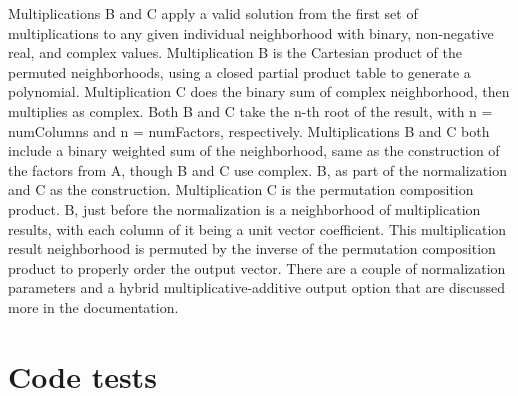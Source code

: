 \documentclass[11pt]{article}
\begin{document}
Multiplications B and C apply a valid solution from the first set of multiplications to any given individual neighborhood with binary, non-negative real, and complex values. Multiplication B is the Cartesian product of the permuted neighborhoods, using a closed partial product table to generate a polynomial. Multiplication C does the binary sum of complex neighborhood, then multiplies as complex. Both B and C take the n-th root of the result, with n = numColumns and n = numFactors, respectively. Multiplications B and C both include a binary weighted sum of the neighborhood, same as the construction of the factors from A, though B and C use complex. B, as part of the normalization and C as the construction. Multiplication C is the permutation composition product. B, just before the normalization is a neighborhood of multiplication results, with each column of it being a unit vector coefficient. This multiplication result neighborhood is permuted by the inverse of the permutation composition product to properly order the output vector. There are a couple of normalization parameters and a hybrid multiplicative-additive output option that are discussed more in the documentation.

\section{Code tests}
\end{document}
